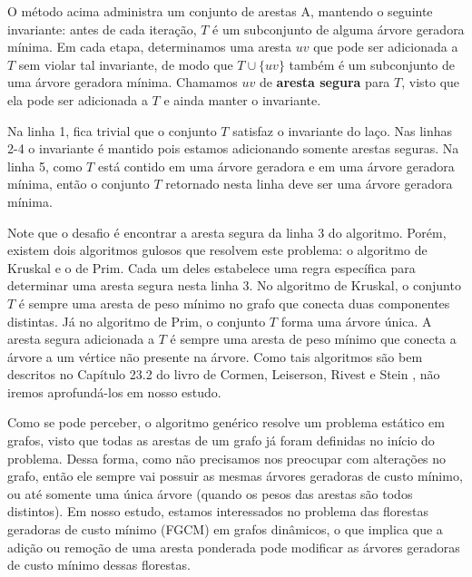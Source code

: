 O método acima administra um conjunto de arestas A, mantendo o seguinte invariante: antes de cada iteração, $T$ é um subconjunto de alguma árvore geradora mínima. Em cada etapa, determinamos uma aresta $uv$ que pode ser adicionada a $T$ sem violar tal invariante, de modo que $T \cup \{uv\}$ também é um subconjunto de uma árvore geradora mínima. Chamamos $uv$ de \textbf{aresta segura} para $T$, visto que ela pode ser adicionada a $T$ e ainda manter o invariante. 

Na linha 1, fica trivial que o conjunto $T$ satisfaz o invariante do laço. Nas linhas 2-4 o invariante é mantido pois estamos adicionando somente arestas seguras. Na linha 5, como $T$ está contido em uma árvore geradora e em uma árvore geradora mínima, então o conjunto $T$ retornado nesta linha deve ser uma árvore geradora mínima. 

Note que o desafio é encontrar a aresta segura da linha 3 do algoritmo. Porém, existem dois algoritmos gulosos que resolvem este problema: o algoritmo de Kruskal e o de Prim. Cada um deles estabelece uma regra específica para determinar uma aresta segura nesta linha 3. No algoritmo de Kruskal, o conjunto $T$ é sempre uma aresta de peso mínimo no grafo que conecta duas componentes distintas. Já no algoritmo de Prim, o conjunto $T$ forma uma árvore única. A aresta segura adicionada a $T$ é sempre uma aresta de peso mínimo que conecta a árvore a um vértice não presente na árvore. Como tais algoritmos são bem descritos no Capítulo 23.2 do livro de Cormen, Leiserson, Rivest e Stein \cite{clrs}, não iremos aprofundá-los em nosso estudo. 

Como se pode perceber, o algoritmo genérico resolve um problema estático em grafos, visto que todas as arestas de um grafo já foram definidas no início do problema. Dessa forma, como não precisamos nos preocupar com alterações no grafo, então ele sempre vai possuir as mesmas árvores geradoras de custo mínimo, ou até somente uma única árvore (quando os pesos das arestas são todos distintos). Em nosso estudo, estamos interessados no problema das florestas geradoras de custo mínimo (FGCM) em grafos dinâmicos, o que implica que a adição ou remoção de uma aresta ponderada pode modificar as árvores geradoras de custo mínimo dessas florestas.

